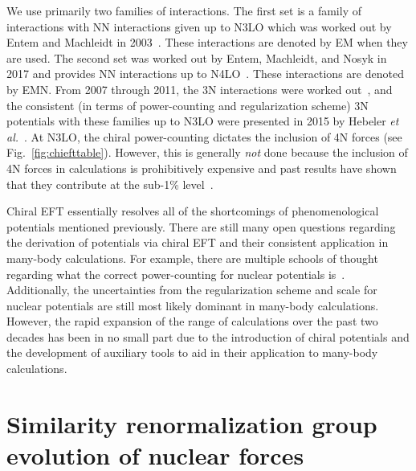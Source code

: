 We use primarily two families of interactions.
The first set is a family of interactions with NN interactions given up to N3LO
which was worked out by Entem and Machleidt in 2003~\cite{Ente03n3lonn}.
These interactions are denoted by EM when they are used.
The second set was worked out by Entem, Machleidt, and Nosyk in 2017
and provides NN interactions up to N4LO~\cite{Ente17n4lonn}.\@
These interactions are denoted by EMN.\@
From 2007 through 2011, the 3N interactions were worked out~\cite{Ishi07chi3n,Bern07chi3n1,Bern11chi3n2},
and the consistent
(in terms of power-counting and regularization scheme)
3N potentials with these families up to N3LO
were presented in 2015 by Hebeler \textit{et al.}~\cite{Hebe15n3lo3n}.
At N3LO, the chiral power-counting dictates the inclusion of 4N forces
(see Fig.~\ref{fig:chiefttable}).
However, this is generally \textit{not} done
because the inclusion of 4N forces in calculations is prohibitively expensive
and past results have shown that they contribute at the sub-1\%
level~\cite{Tews12neutronmatter4n,Schu18fourbody}.

Chiral EFT essentially resolves all of the shortcomings of phenomenological potentials mentioned previously.
There are still many open questions regarding the derivation of potentials via chiral EFT
and their consistent application in many-body calculations.
For example, there are multiple schools of thought regarding
what the correct power-counting
for nuclear potentials is~\cite{Bean01pertchieft,Nogg05pertchieft,Epel18hownottorenormalize}.
Additionally, the uncertainties from the regularization scheme and scale for nuclear potentials
are still most likely dominant in many-body calculations.
However, the rapid expansion of the range of \abinitio{} calculations over the past two decades has been in no small part
due to the introduction of chiral potentials and the development of auxiliary tools to aid in their application
to many-body calculations.

\section{Similarity renormalization group evolution of nuclear forces}\label{sec:srg}

